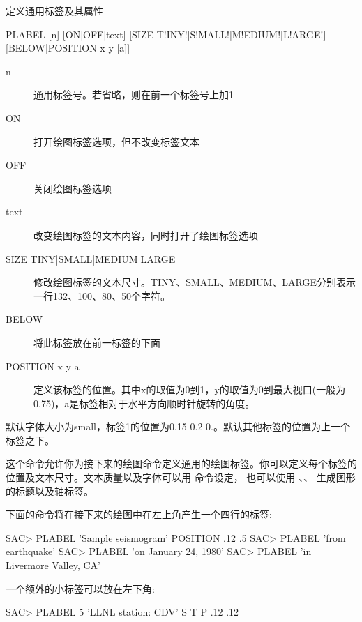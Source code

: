 \label{cmd:plabel}

定义通用标签及其属性

\begin{SACSTX}
PLABEL [n] [ON|OFF|text] [SIZE T!INY!|S!MALL!|M!EDIUM!|L!ARGE!]
    [BELOW|POSITION x y [a]]
\end{SACSTX}

\begin{description}
\item [n] 通用标签号。若省略，则在前一个标签号上加1
\item [ON] 打开绘图标签选项，但不改变标签文本
\item [OFF] 关闭绘图标签选项
\item [text] 改变绘图标签的文本内容，同时打开了绘图标签选项
\item [SIZE TINY|SMALL|MEDIUM|LARGE] 修改绘图标签的文本尺寸。TINY、SMALL、MEDIUM、LARGE分别表示
    一行132、100、80、50个字符。
\item [BELOW] 将此标签放在前一标签的下面
\item [POSITION x y a] 定义该标签的位置。其中x的取值为0到1，y的取值为0到最大视口(一般为0.75)，a是标签相对于水平方向顺时针旋转的角度。
\end{description}

默认字体大小为small，标签1的位置为0.15 0.2 0.。默认其他标签的位置为上一个标签之下。

这个命令允许你为接下来的绘图命令定义通用的绘图标签。你可以定义每个标签的
位置及文本尺寸。文本质量以及字体可以用  命令设定，
也可以使用 、、
生成图形的标题以及轴标签。

下面的命令将在接下来的绘图中在左上角产生一个四行的标签:
\begin{SACCode}
SAC> PLABEL 'Sample seismogram' POSITION .12 .5
SAC> PLABEL 'from earthquake'
SAC> PLABEL 'on January 24, 1980'
SAC> PLABEL 'in Livermore Valley, CA'
\end{SACCode}

一个额外的小标签可以放在左下角:
\begin{SACCode}
SAC> PLABEL 5 'LLNL station: CDV' S T P .12 .12
\end{SACCode}
